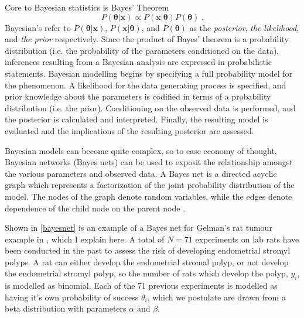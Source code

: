 Core to Bayesian statistics is Bayes' Theorem
%
\begin{equation}\label{Bayes}
	P( \bm{\theta} \vert \mathbf{x}) \propto P(\mathbf{x} \vert \bm{\theta}) P(\bm{\theta}) \>.
\end{equation}
%
Bayesian's refer to $  P( \bm{\theta} \vert \mathbf{x}) $, $ P(\mathbf{x} \vert \bm{\theta})  $, and $P(\bm{\theta})$ as the \textit{posterior}, \textit{the likelihood}, and \textit{the prior} respectively.  Since the product of Bayes' theorem is a probability distribution (i.e. the probability of the parameters conditioned on the data), inferences resulting from a Bayesian analysis are expressed in probabilistic statements. Bayesian modelling begins by specifying a full probability model for the phenomenon.  A likelihood for the data generating process is specified, and prior knowledge about the parameters is codified in terms of a probability distribution (i.e. the prior).  Conditioning on the observed data is performed, and the posterior is calculated and interpreted.  Finally, the resulting model is evaluated and the implications of the resulting posterior are assessed.

Bayesian models can become quite complex, so to ease economy of thought, Bayesian networks (Bayes nets) can be used to exposit the relationship amongst the various parameters and observed data.  A Bayes net is a directed acyclic graph which represents a factorization of the joint probability distribution of the model. The nodes of the graph denote random variables, while the edges denote dependence of the child node on the parent node \cite{Bishop2006pattern}. 

Shown in \cref{bayesnet} is an example of a Bayes net for Gelman's rat tumour example in \cite{gelman2013bayesian}, which I explain here.  A total of $ N = 71 $ experiments on lab rats have been conducted in the past to assess the risk of developing endometrial stromyl polyps.  A rat can either develop the endometrial stromal polyp, or not develop the endometrial stromyl polyp, so the number of rats which develop the polyp, $ y_i $, is modelled as binomial.  Each of the 71 previous experiments is modelled as having it's own probability of success $ \theta_i $, which we postulate are drawn from a beta distribution with parameters $ \alpha $ and $ \beta $.  

